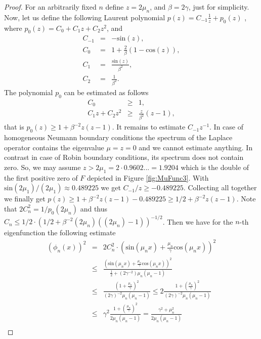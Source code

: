 \documentclass[a4paper,11pt]{article}
\theoremstyle{plain} %
\theoremstyle{definition} %
\theoremstyle{remark} %
\theoremstyle{remark}
\begin{document}
\begin{proof}
For an arbitrarily fixed $n$ define $ z = 2 \mu_n $, and $ \beta = 2 \gamma $, just for simplicity. Now, let us define the following Laurent polynomial $ p(z) = C_{-1} \frac{1}{z} + p_0 (z ) $ , where $p_0 ( z) = C_0 + C_1 z + C_2 z^2 $, and
\begin{eqnarray*}
C_{-1} & = & - \mathrm{sin}(z), \\
C_0 & = & 1 + \frac{2}{\beta }\left( 1 - \mathrm{cos}(z) \right), \\
C_1 & = & \frac{\mathrm{sin}(z)}{\beta^2 }, \\
C_2 & = & \frac{1}{\beta^2 } .
\end{eqnarray*}
The polynomial $p_0 $ can be estimated as follows 
\begin{eqnarray*}
C_0 & \geq & 1, \\
C_1 z + C_2 z^2 & \geq & \frac{z}{\beta^2 } ( z -1 ),
\end{eqnarray*}
that is $ p_0 (z) \geq 1 + \beta^{-2} z (z-1 ) $. It remains to estimate $ C_{-1} z^{-1} $. In case of homogeneous Neumann boundary conditions the spectrum of the Laplace operator contains the eigenvalue $\mu = z = 0 $ and we cannot estimate anything. In contrast in case of Robin boundary conditions, its spectrum does not contain zero. So, we may assume $ z > 2 \mu_1 = 2\cdot 0.9602 ... = 1.9204 $ which is the double of the first positive zero of $F$ depicted in Figure \ref{fig:MuFunc3}. With $ \mathrm{sin}(2 \mu_1)/(2\mu_1) \approx 0.489225 $ we get $ C_{-1} / z \geq - 0.489225 $. Collecting all together we finally get $ p(z) \geq 1 + \beta^{-2} z (z-1 ) - 0.489225 \geq 1/2 + \beta^{-2} z (z-1 ) $. Note that $ 2 C_n^2 = 1 / p_0 (2 \mu_n )  $ and thus $ C_n \leq 1/2 \cdot (1/2 + \beta^{-2} (2\mu_n) ((2\mu_n)-1 ) )^{-1/2} $. Then we have for the $n$-th eigenfunction the following estimate
\begin{eqnarray*}
\left(\phi_n (x) \right)^2  & = & 2 C_n^2 \cdot \left(\mathrm{sin} (\mu_n x) + \frac{\mu_n }{\gamma } \mathrm{cos} (\mu_n x) \right)^2 \\
 & \leq & \frac{\left(\mathrm{sin} (\mu_n x) + \frac{\mu_n }{\gamma } \mathrm{cos} (\mu_n x) \right)^2 }{\tfrac{1}{2} + (2\gamma^{-2}) \mu_n (\mu_n-1 )} \\
 & \leq & \frac{\left(1 + \frac{\mu_n }{\gamma } \right)^2 }{(2\gamma )^{-2} \mu_n (\mu_n-1 )} \leq 2\frac{1 +  \left(\frac{\mu_n }{\gamma } \right)^2 }{(2\gamma )^{-2} \mu_n (\mu_n-1 )} \\
 & \leq & \gamma^2\frac{1 +  \left(\frac{\mu_n }{\gamma } \right)^2 }{2 \mu_n (\mu_n-1 )} = \frac{\gamma^2 +  \mu_n^2 }{2 \mu_n (\mu_n-1 )} \\

\end{eqnarray*}
\end{proof}
\end{document}
